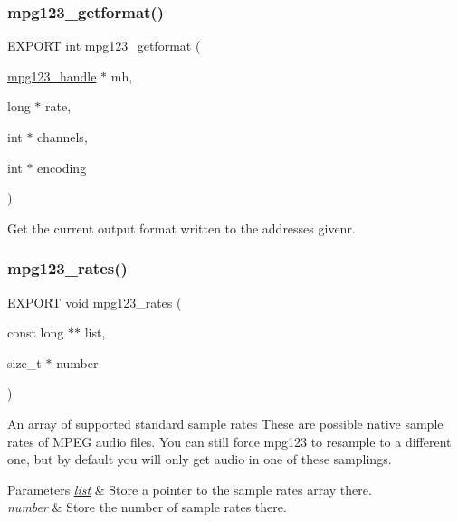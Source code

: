 \subsubsection{\texorpdfstring{mpg123\+\_\+getformat()}{mpg123\_getformat()}}
{\footnotesize\ttfamily E\+X\+P\+O\+RT int mpg123\+\_\+getformat (\begin{DoxyParamCaption}\item[{\hyperlink{group__mpg123__init_ga6728e2839a395f3a07d4514da659faca}{mpg123\+\_\+handle} $\ast$}]{mh,  }\item[{long $\ast$}]{rate,  }\item[{int $\ast$}]{channels,  }\item[{int $\ast$}]{encoding }\end{DoxyParamCaption})}

Get the current output format written to the addresses givenr. \mbox{\label{group__mpg123__output_ga22414ab3551bba2b21a345ba70bdeb6a}} 
\subsubsection{\texorpdfstring{mpg123\+\_\+rates()}{mpg123\_rates()}}
{\footnotesize\ttfamily E\+X\+P\+O\+RT void mpg123\+\_\+rates (\begin{DoxyParamCaption}\item[{const long $\ast$$\ast$}]{list,  }\item[{size\+\_\+t $\ast$}]{number }\end{DoxyParamCaption})}

An array of supported standard sample rates These are possible native sample rates of M\+P\+EG audio files. You can still force mpg123 to resample to a different one, but by default you will only get audio in one of these samplings. 
\begin{DoxyParams}{Parameters}
{\em \hyperlink{protocollist-p}{list}} & Store a pointer to the sample rates array there. \\
\hline
{\em number} & Store the number of sample rates there. \\
\hline
\end{DoxyParams}
